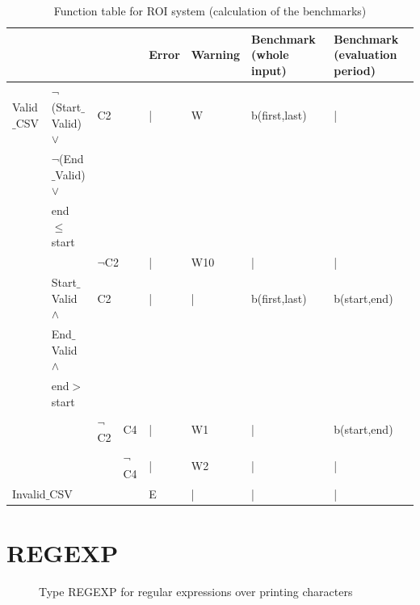 \documentclass[runningheads,12pt]{article}
\begin{document}
\begin{landscape}

\begin{table}[H]
{
\centering

\begin{tabular}{|l|l|l|l||l|l|l|l|}
\hline
\multicolumn{4}{|c||}{} & Error & Warning & Benchmark (whole input) & Benchmark (evaluation period)\\ 

\hline
Valid$\_$CSV & $\lnot$(Start$\_$Valid) $\vee$ & \multicolumn{2}{|l||}{C2} & | & W & b(first,last) & |\\ 
& $\lnot$(End$\_$Valid) $\vee$& \multicolumn{2}{|l||}{} &&& &\\
& end $\le$ start & \multicolumn{2}{|l||}{} & &&&\\

\cline{3-8}
& & \multicolumn{2}{|l||}{$\lnot$C2}& | & W10 & | & |\\ 

\cline{2-8}
& Start$\_$Valid  $\wedge$  & \multicolumn{2}{|l||}{C2} & | & | & b(first,last) & b(start,end)\\ 
& End$\_$Valid $\wedge$  & \multicolumn{2}{|l||}{} &&&&\\
& end$>$start   & \multicolumn{2}{|l||}{}&&&&\\

\cline{3-8}
&& $\lnot$C2 & C4 & | & W1 & | & b(start,end)\\

\cline{4-8}
&& & $\lnot$C4 & | & W2 & | & |\\

\hline
\multicolumn{4}{|l||}{Invalid$\_$CSV} & E & |& |& |\\ 

\hline
\end{tabular}

\caption{Function table for ROI system (calculation of the benchmarks)}
\label{table:ftable_bench}
}
\end{table}
\end{landscape}





\newpage
\appendix

\section{REGEXP}

\begin{figure}

\caption{Type REGEXP for regular expressions over printing characters}
\end{figure}
\end{document}
